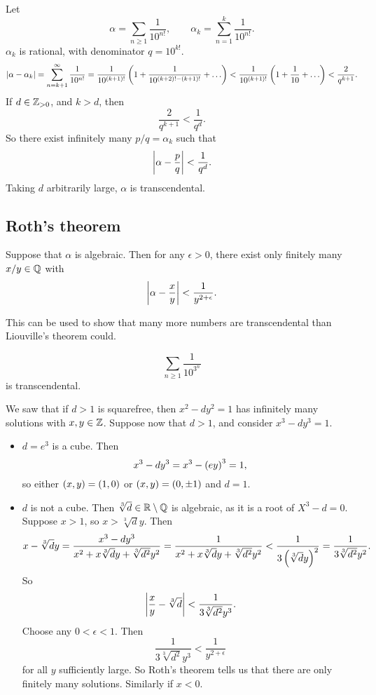 \begin{example*}
Let
$$ \alpha = \sum_{n \ge 1} \dfrac{1}{10^{n!}}, \qquad \alpha_k = \sum_{n = 1}^k \dfrac{1}{10^{n!}}. $$
$ \alpha_k $ is rational, with denominator $ q = 10^{k!} $.
$$ \abs{\alpha - \alpha_k} = \sum_{n = k + 1}^\infty \dfrac{1}{10^{n!}} = \dfrac{1}{10^{\rb{k + 1}!}}\rb{1 + \dfrac{1}{10^{\rb{k + 2}! - \rb{k + 1}!}} + \dots} < \dfrac{1}{10^{\rb{k + 1}!}}\rb{1 + \dfrac{1}{10} + \dots} < \dfrac{2}{q^{k + 1}}. $$
If $ d \in \mathbb{Z}_{> 0} $, and $ k > d $, then
$$ \dfrac{2}{q^{k + 1}} < \dfrac{1}{q^d}. $$
So there exist infinitely many $ p / q = \alpha_k $ such that
$$ \left\lvert \alpha - \dfrac{p}{q} \right\rvert < \dfrac{1}{q^d}. $$
Taking $ d $ arbitrarily large, $ \alpha $ is transcendental.
\end{example*}


\subsection{Roth's theorem}

\begin{theorem}
Suppose that $ \alpha $ is algebraic. Then for any $ \epsilon > 0 $, there exist only finitely many $ x / y \in \mathbb{Q} $ with
$$ \left\lvert \alpha - \dfrac{x}{y} \right\rvert < \dfrac{1}{y^{2 + \epsilon}}. $$
\end{theorem}

This can be used to show that many more numbers are transcendental than Liouville's theorem could.

\begin{example*}
$$ \sum_{n \ge 1} \dfrac{1}{10^{3^n}} $$
is transcendental.
\end{example*}

\begin{example*}
We saw that if $ d > 1 $ is squarefree, then $ x^2 - dy^2 = 1 $ has infinitely many solutions with $ x, y \in \mathbb{Z} $. Suppose now that $ d > 1 $, and consider $ x^3 - dy^3 = 1 $.
\begin{itemize}
\item $ d = e^3 $ is a cube. Then
$$ x^3 - dy^3 = x^3 - \left( ey \right)^3 = 1, $$
so either $ \left( x, y \right) = \left( 1, 0 \right) $ or $ \left( x, y \right) = \left( 0, \pm1 \right) $ and $ d = 1 $.
\item $ d $ is not a cube. Then $ \sqrt[3]{d} \in \mathbb{R} \setminus \mathbb{Q} $ is algebraic, as it is a root of $ X^3 - d = 0 $. Suppose $ x > 1 $, so $ x > \sqrt[3]{d}y $. Then
$$ x - \sqrt[3]{d}y = \dfrac{x^3 - dy^3}{x^2 + x\sqrt[3]{d}y + \sqrt[3]{d^2}y^2} = \dfrac{1}{x^2 + x\sqrt[3]{d}y + \sqrt[3]{d^2}y^2} < \dfrac{1}{3\left( \sqrt[3]{d}y \right)^2} = \dfrac{1}{3\sqrt[3]{d^2}y^2}. $$
So
$$ \left\lvert \dfrac{x}{y} - \sqrt[3]{d} \right\rvert < \dfrac{1}{3\sqrt[3]{d^2}y^3}. $$
Choose any $ 0 < \epsilon < 1 $. Then
$$ \dfrac{1}{3\sqrt[3]{d^2}y^3} < \dfrac{1}{y^{2 + \epsilon}} $$
for all $ y $ sufficiently large. So Roth's theorem tells us that there are only finitely many solutions. Similarly if $ x < 0 $.
\end{itemize}
\end{example*}

